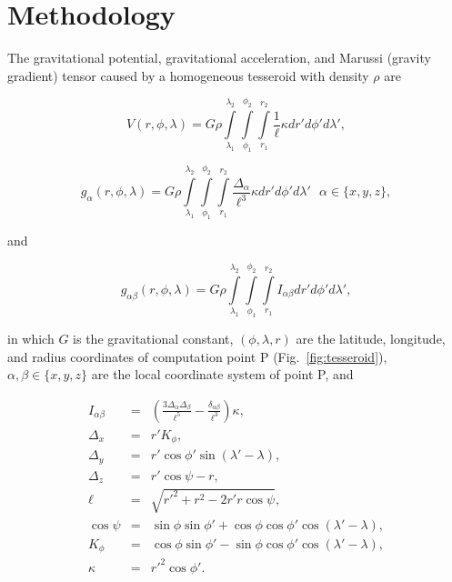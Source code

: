 \section{Methodology}

The gravitational potential,
gravitational acceleration,
and Marussi (gravity gradient) tensor
caused by a homogeneous tesseroid
with density $\rho$
are \citep{Grombein2013}

\begin{equation}
    V(r,\phi,\lambda) = G \rho
        \int\limits_{\lambda_1}^{\lambda_2}
        \int\limits_{\phi_1}^{\phi_2}
        \int\limits_{r_1}^{r_2}
        \frac{1}{\ell} \kappa  dr' d\phi' d\lambda',
    \label{eq:tesspot}
\end{equation}

\begin{equation}
    g_{\alpha}(r,\phi,\lambda) = G \rho
        \int\limits_{\lambda_1}^{\lambda_2}
        \int\limits_{\phi_1}^{\phi_2}
        \int\limits_{r_1}^{r_2}
        \frac{\Delta_{\alpha}}{\ell^3} \kappa dr' d\phi' d\lambda'
        \ \ \ \alpha \in \{x,y,z\},
    \label{eq:tessgrav}
\end{equation}

\noindent
and

\begin{equation}
    g_{\alpha\beta}(r,\phi,\lambda) = G \rho
        \int\limits_{\lambda_1}^{\lambda_2}
        \int\limits_{\phi_1}^{\phi_2}
        \int\limits_{r_1}^{r_2}
        I_{\alpha\beta}
        dr' d\phi' d\lambda',
    \label{eq:tesstensor}
\end{equation}

\noindent
in which
$G$ is the gravitational constant,
$(\phi, \lambda, r)$ are
the latitude, longitude, and radius
coordinates of computation point P (Fig.~\ref{fig:tesseroid}),
$\alpha,\beta \in \{x,y,z\}$
are the local coordinate system of point P,
and

\begin{eqnarray}
    I_{\alpha\beta} &=&
        \left(
            \frac{3\Delta_{\alpha} \Delta_{\beta}}{\ell^5} -
            \frac{\delta_{\alpha\beta}}{\ell^3}
        \right) \kappa, \\
    \Delta_x &=& r' K_{\phi} , \\
    \Delta_y &=& r' \cos \phi' \sin(\lambda' - \lambda) , \\
    \Delta_z &=& r' \cos \psi - r, \\
    \ell &=& \sqrt{r'^2 + r^2 - 2 r' r \cos \psi} , \\
    \cos\psi &=& \sin\phi\sin\phi' + \cos\phi\cos\phi'
                 \cos(\lambda' - \lambda) , \\
    K_{\phi} &=& \cos\phi\sin\phi' - \sin\phi\cos\phi'
                 \cos(\lambda' - \lambda), \\
    \kappa &=& {r'}^2 \cos \phi'.
\end{eqnarray}

